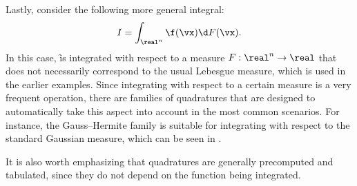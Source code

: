 Lastly, consider the following more general integral:
\[
  I = \int_{\real^n} \f(\vx) \d F(\vx).
\]
In this case, \f is integrated with respect to a measure $F: \real^n \to \real$
\cite{durrett2010} that does not necessarily correspond to the usual Lebesgue
measure, which is used in the earlier examples. Since integrating with respect
to a certain measure is a very frequent operation, there are families of
quadratures that are designed to automatically take this aspect into account in
the most common scenarios. For instance, the Gauss--Hermite family is suitable
for integrating with respect to the standard Gaussian measure, which can be seen
in .

It is also worth emphasizing that quadratures are generally precomputed and
tabulated, since they do not depend on the function being integrated.
